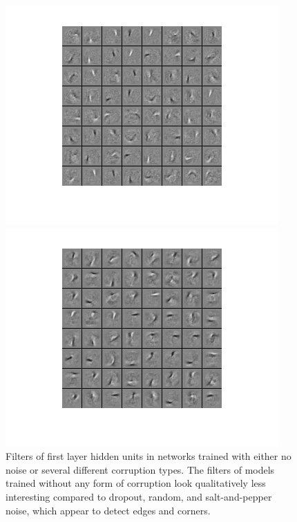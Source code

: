 \documentclass{article} %
\begin{document}
\begin{figure}[ht]
\begin{minipage}[b]{0.5\linewidth}
  \end{minipage} 
  \begin{minipage}[b]{0.5\linewidth}
    \centering
    \includegraphics[width=\linewidth]{filters_drop_layer1.png} 
    \vspace{4ex}
  \end{minipage}%
  \begin{minipage}[b]{0.5\linewidth}
    \centering
    \includegraphics[width=\linewidth]{filters_saltPepper_layer1.png} 
    \vspace{4ex}
  \end{minipage} 
  \caption{Filters of first layer hidden units in networks trained with either no noise or several different corruption types. The filters of models trained without any form of corruption look qualitatively less interesting compared to dropout, random, and salt-and-pepper noise, which appear to detect edges and corners.}
\end{figure}
\end{document}

